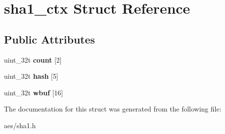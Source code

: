 \hypertarget{structsha1__ctx}{}\section{sha1\+\_\+ctx Struct Reference}
\label{structsha1__ctx}
\subsection*{Public Attributes}
\begin{DoxyCompactItemize}
\item 
uint\+\_\+32t {\bfseries count} \mbox{[}2\mbox{]}\hypertarget{structsha1__ctx_a8808fa28279c551c7b372b6f1fc51b21}{}\label{structsha1__ctx_a8808fa28279c551c7b372b6f1fc51b21}

\item 
uint\+\_\+32t {\bfseries hash} \mbox{[}5\mbox{]}\hypertarget{structsha1__ctx_aa858da45a95035b895891b7ea2d3c360}{}\label{structsha1__ctx_aa858da45a95035b895891b7ea2d3c360}

\item 
uint\+\_\+32t {\bfseries wbuf} \mbox{[}16\mbox{]}\hypertarget{structsha1__ctx_a6ca5c5ec6aa5c25bc67cd243c03402a3}{}\label{structsha1__ctx_a6ca5c5ec6aa5c25bc67cd243c03402a3}

\end{DoxyCompactItemize}


The documentation for this struct was generated from the following file\+:\begin{DoxyCompactItemize}
\item 
aes/sha1.\+h\end{DoxyCompactItemize}
